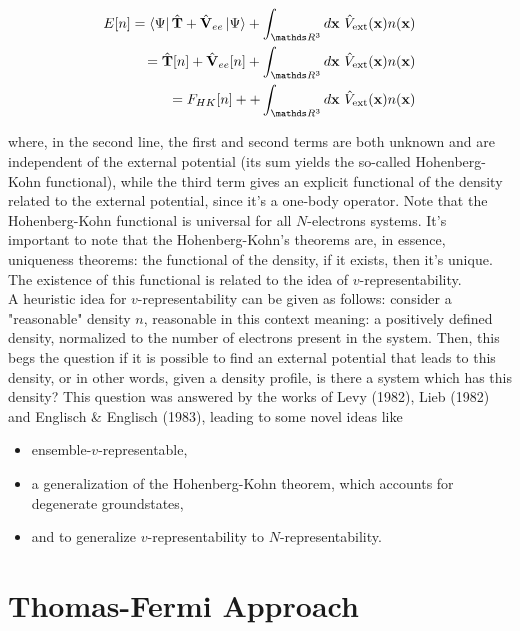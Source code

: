 \documentclass{homework}
\begin{document}
\begin{align}
    E[n] = \bra{\Psi} \hat{\bf T}+\hat{\bf V}_{ee}\ket{\Psi} + \int_{\R^3} d{\bf x} \blanky \hat{V}_{\textnormal{ext}}({\bf x}) n({\bf x}) \\
    = \hat{\bf T}[n] + \hat{\bf V}_{ee}[n] + \int_{\R^3} d{\bf x} \blanky \hat{V}_{\textnormal{ext}}({\bf x}) n({\bf x}) \\
    = F_{HK}[n] + + \int_{\R^3} d{\bf x} \blanky \hat{V}_{\textnormal{ext}}({\bf x}) n({\bf x})
\end{align}

where, in the second line, the first and second terms are both unknown and are independent of the external potential (its sum yields the so-called Hohenberg-Kohn functional), while the third term gives an explicit functional of the density related to the external potential, since it's a one-body operator. Note that the Hohenberg-Kohn functional is universal for all $N$-electrons systems. It's important to note that the Hohenberg-Kohn's theorems are, in essence, uniqueness theorems: the functional of the density, if it exists, then it's unique. The existence of this functional is related to the idea of $v$-representability. \\

A heuristic idea for $v$-representability can be given as follows: consider a "reasonable" density $n$, reasonable in this context meaning: a positively defined density, normalized to the number of electrons present in the system. Then, this begs the question if it is possible to find an external potential that leads to this density, or in other words, given a density profile, is there a system which has this density?
This question was answered by the works of Levy (1982), Lieb (1982) and Englisch \& Englisch (1983), leading to some novel ideas like 

\begin{itemize}
    \item ensemble-$v$-representable, 
    \item a generalization of the Hohenberg-Kohn theorem, which accounts for degenerate groundstates,
    \item and to generalize $v$-representability to $N$-representability. \\
\end{itemize}

\section{Thomas-Fermi Approach}
\end{document}
